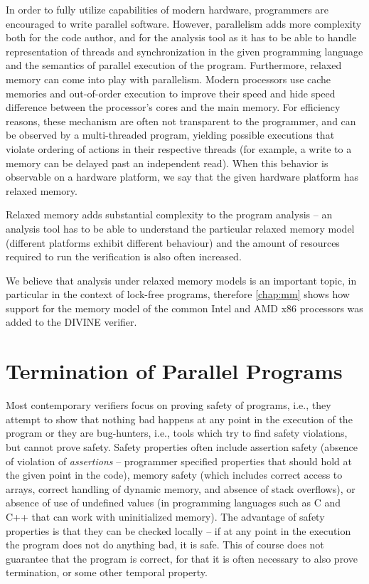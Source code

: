 In order to fully utilize capabilities of modern hardware, programmers are encouraged to write parallel software.
However, parallelism adds more complexity both for the code author, and for the analysis tool as it has to be able to handle representation of threads and synchronization in the given programming language and the semantics of parallel execution of the program.
Furthermore, relaxed memory can come into play with parallelism.
Modern processors use cache memories and out-of-order execution to improve their speed and hide speed difference between the processor's cores and the main memory.
For efficiency reasons, these mechanism are often not transparent to the programmer, and can be observed by a multi-threaded program, yielding possible executions that violate ordering of actions in their respective threads (for example, a write to a memory can be delayed past an independent read).
When this behavior is observable on a hardware platform, we say that the given hardware platform has relaxed memory.

Relaxed memory adds substantial complexity to the program analysis --
an analysis tool has to be able to understand the particular relaxed memory model (different platforms exhibit different behaviour) and the amount of resources required to run the verification is also often increased.

We believe that analysis under relaxed memory models is an important topic,
in particular in the context of lock-free programs, therefore \autoref{chap:mm}
shows how support for the memory model of the common Intel and AMD x86
processors was added to the DIVINE verifier.

\section{Termination of Parallel Programs}

Most contemporary verifiers focus on proving safety of programs, i.e., they
attempt to show that nothing bad happens at any point in the execution of the
program or they are bug-hunters, i.e., tools which try to find safety violations, but cannot prove safety.
Safety properties often include assertion safety (absence of violation of \emph{assertions} -- programmer specified properties that should hold at the given point in the code), memory safety (which includes correct access to arrays, correct handling of dynamic memory, and absence of stack overflows), or absence of use of undefined values (in programming languages such as C and C++ that can work with uninitialized memory).
The advantage of safety properties is that they can be checked locally -- if at
any point in the execution the program does not do anything bad, it is safe.
This of course does not guarantee that the program is correct, for that it is often necessary to also prove termination, or some other temporal property.

